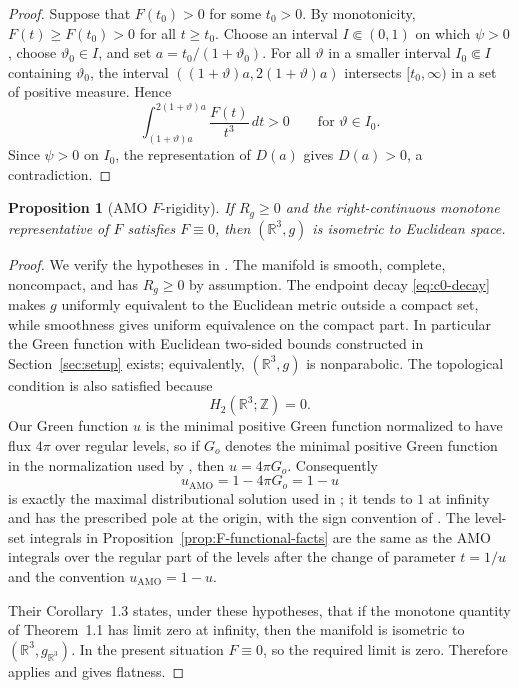 \documentclass[11pt]{amsart}
\numberwithin{equation}{section}
\newtheorem{proposition}[theorem]{Proposition}
\theoremstyle{definition}
\newcommand{\R}{\mathbb R}
\begin{document}
\begin{proof}
Suppose that $F(t_0)>0$ for some $t_0>0$.  By monotonicity, $F(t)\ge F(t_0)>0$ for all $t\ge t_0$.  Choose an interval $I\Subset(0,1)$ on which $\psi>0$, choose $\vartheta_0\in I$, and set $a=t_0/(1+\vartheta_0)$.  For all $\vartheta$ in a smaller interval $I_0\Subset I$ containing $\vartheta_0$, the interval $((1+\vartheta)a,2(1+\vartheta)a)$ intersects $[t_0,\infty)$ in a set of positive measure.  Hence
$$
        \int_{(1+\vartheta)a}^{2(1+\vartheta)a}\frac{F(t)}{t^3}\,dt>0
        \qquad\text{for }\vartheta\in I_0.
$$
Since $\psi>0$ on $I_0$, the representation of $D(a)$ gives $D(a)>0$, a contradiction.
\end{proof}

\begin{proposition}[AMO $F$-rigidity]\label{prop:F-rigidity-appendix}
If $R_g\ge0$ and the right-continuous monotone representative of $F$ satisfies $F\equiv0$, then $(\R^3,g)$ is isometric to Euclidean space.
\end{proposition}

\begin{proof}
We verify the hypotheses in \cite[Theorem~1.1 and Corollary~1.3]{AMO}.  The manifold is smooth, complete, noncompact, and has $R_g\ge0$ by assumption.  The endpoint decay \eqref{eq:c0-decay} makes $g$ uniformly equivalent to the Euclidean metric outside a compact set, while smoothness gives uniform equivalence on the compact part.  In particular the Green function with Euclidean two-sided bounds constructed in Section~\ref{sec:setup} exists; equivalently, $(\R^3,g)$ is nonparabolic.  The topological condition is also satisfied because
$$
        H_2(\R^3;\mathbb Z)=0.
$$
Our Green function $u$ is the minimal positive Green function normalized to have flux $4\pi$ over regular levels, so if $G_o$ denotes the minimal positive Green function in the normalization used by \cite{AMO}, then $u=4\pi G_o$.  Consequently
$$
        u_{\mathrm{AMO}}=1-4\pi G_o=1-u
$$
is exactly the maximal distributional solution used in \cite[Theorem~1.1]{AMO}; it tends to $1$ at infinity and has the prescribed pole at the origin, with the sign convention of \cite{AMO}.  The level-set integrals in Proposition~\ref{prop:F-functional-facts} are the same as the AMO integrals over the regular part of the levels after the change of parameter $t=1/u$ and the convention $u_{\mathrm{AMO}}=1-u$.

Their Corollary~1.3 states, under these hypotheses, that if the monotone quantity of Theorem~1.1 has limit zero at infinity, then the manifold is isometric to $(\R^3,g_{\R^3})$.  In the present situation $F\equiv0$, so the required limit is zero.  Therefore \cite[Corollary~1.3]{AMO} applies and gives flatness.
\end{proof}
\end{document}
